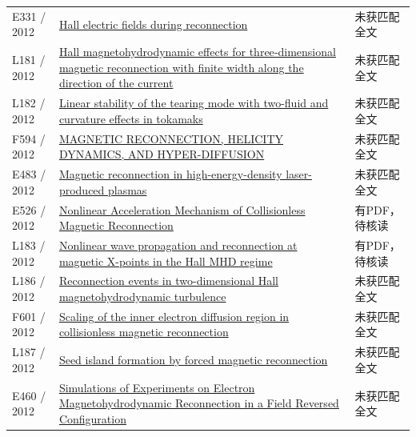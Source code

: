 \begin{longtable}{P{24mm}P{97mm}P{27mm}}
E331 / 2012 & \href{https://ui.adsabs.harvard.edu/abs/2012cosp...39..641G/abstract}{Hall electric fields during reconnection} & 未获匹配全文\\

L181 / 2012 & \href{https://doi.org/10.1029/2011ja017006}{Hall magnetohydrodynamic effects for three‐dimensional magnetic reconnection with finite width along the direction of the current} & 未获匹配全文\\

L182 / 2012 & \href{https://doi.org/10.1063/1.4754000}{Linear stability of the tearing mode with two-fluid and curvature effects in tokamaks} & 未获匹配全文\\

F594 / 2012 & \href{https://doi.org/10.1088/0004-637x/757/2/173}{MAGNETIC RECONNECTION,  HELICITY DYNAMICS,  AND HYPER-DIFFUSION} & 未获匹配全文\\

E483 / 2012 & \href{https://doi.org/10.1063/1.3694119}{Magnetic reconnection in high-energy-density laser-produced plasmas} & 未获匹配全文\\

E526 / 2012 & \href{https://doi.org/10.48550/arxiv.1210.0630}{Nonlinear Acceleration Mechanism of Collisionless Magnetic Reconnection} & 有PDF，待核读\\

L183 / 2012 & \href{https://doi.org/10.1051/0004-6361/201219098}{Nonlinear wave propagation and reconnection at magnetic X-points in the Hall MHD regime} & 有PDF，待核读\\

L186 / 2012 & \href{https://doi.org/10.1063/1.4754151}{Reconnection events in two-dimensional Hall magnetohydrodynamic turbulence} & 未获匹配全文\\

F601 / 2012 & \href{https://doi.org/10.1029/2011ja017464}{Scaling of the inner electron diffusion region in collisionless magnetic reconnection} & 未获匹配全文\\

L187 / 2012 & \href{https://doi.org/10.1088/0029-5515/52/6/063020}{Seed island formation by forced magnetic reconnection} & 未获匹配全文\\

E460 / 2012 & \href{http://absimage.aps.org/image/TSF12/MWS_TSF12-2012-000189.pdf}{Simulations of Experiments on Electron Magnetohydrodynamic Reconnection in a Field Reversed Configuration} & 未获匹配全文\\


\end{longtable}
